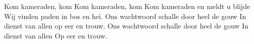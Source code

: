 \beginverse*
Kom kameraden, kom
Kom kameraden, kom
Kom kameraden 
en meldt u blijde
Wij vinden paden in bos en hei.
\endverse
\beginverse*
Ons wachtwoord schalle
door heel de gouw
In dienst van allen
op eer en trouw.
\endverse
\beginverse*
Ons wachtwoord schalle
door heel de gouw
In dienst van allen
Op eer en trouw.
\endverse
\endsong